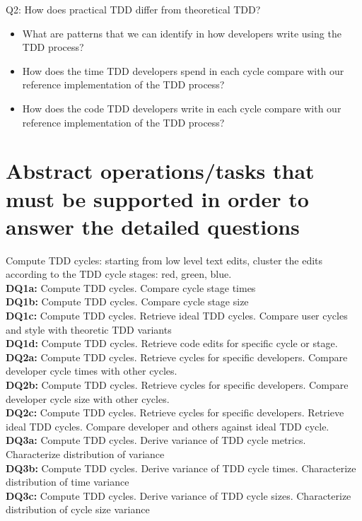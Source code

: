 \documentclass[journal]{vgtc}                %
\begin{document}
Q2: How does practical TDD differ from theoretical TDD?
\begin{itemize}
	\item What are patterns that we can identify in how developers write using the TDD process?
	\item How does the time TDD developers spend in each cycle compare with our reference implementation of the TDD process?
	\item How does the code TDD developers write in each cycle compare with our reference implementation of the TDD process?
\end{itemize}

\section{Abstract operations/tasks that must be supported in order to answer the detailed questions
}

Compute TDD cycles: starting from low level text edits, cluster the edits according to the TDD cycle stages: red, green, blue. \\
 
\noindent\textbf{DQ1a:} Compute TDD cycles. Compare cycle stage times \\
\textbf{DQ1b:} Compute TDD cycles. Compare cycle stage size \\
\textbf{DQ1c:} Compute TDD cycles. Retrieve ideal TDD cycles. Compare user cycles and style with theoretic TDD variants \\
\textbf{DQ1d:} Compute TDD cycles. Retrieve code edits for specific cycle  or stage. \\
 
\noindent\textbf{DQ2a:} Compute TDD cycles. Retrieve cycles for specific developers. Compare developer cycle times with other cycles. \\
\textbf{DQ2b:} Compute TDD cycles. Retrieve cycles for specific developers. Compare developer cycle size with other cycles. \\
\textbf{DQ2c:} Compute TDD cycles. Retrieve cycles for specific developers. Retrieve ideal TDD cycles. Compare developer and others against ideal TDD cycle. \\
 
\noindent\textbf{DQ3a:} Compute TDD cycles. Derive variance of TDD cycle metrics. Characterize distribution of variance \\
\textbf{DQ3b:} Compute TDD cycles. Derive variance of TDD cycle times. Characterize distribution of time variance \\
\textbf{DQ3c:} Compute TDD cycles. Derive variance of TDD cycle sizes. Characterize distribution of cycle size variance \\
 
\end{document}
